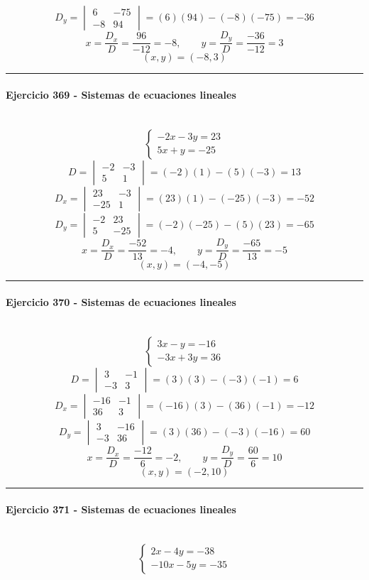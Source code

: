\documentclass[10pt,a4paper]{article}
\newcommand{\res}[1]{\paragraph{#1}\mbox{}\\[-1.2em]}
\begin{document}
\[ D_y=\begin{vmatrix}6&-75\\-8&94\end{vmatrix}=(6)(94)-(-8)(-75)=-36 \]
\[ x=\frac{D_x}{D}=\frac{96}{-12}=-8,\qquad y=\frac{D_y}{D}=\frac{-36}{-12}=3 \]
\[ \boxed{(x,y)=(-8,3)} \]
\vspace{1mm}\hrule\vspace{2mm}
\res{Ejercicio 369 - Sistemas de ecuaciones lineales}
\[ \begin{cases}- 2 x - 3 y=23\\5 x + y=-25\end{cases} \]
\[ D=\begin{vmatrix}-2&-3\\5&1\end{vmatrix}=(-2)(1)-(5)(-3)=13 \]
\[ D_x=\begin{vmatrix}23&-3\\-25&1\end{vmatrix}=(23)(1)-(-25)(-3)=-52 \]
\[ D_y=\begin{vmatrix}-2&23\\5&-25\end{vmatrix}=(-2)(-25)-(5)(23)=-65 \]
\[ x=\frac{D_x}{D}=\frac{-52}{13}=-4,\qquad y=\frac{D_y}{D}=\frac{-65}{13}=-5 \]
\[ \boxed{(x,y)=(-4,-5)} \]
\vspace{1mm}\hrule\vspace{2mm}
\res{Ejercicio 370 - Sistemas de ecuaciones lineales}
\[ \begin{cases}3 x - y=-16\\- 3 x + 3 y=36\end{cases} \]
\[ D=\begin{vmatrix}3&-1\\-3&3\end{vmatrix}=(3)(3)-(-3)(-1)=6 \]
\[ D_x=\begin{vmatrix}-16&-1\\36&3\end{vmatrix}=(-16)(3)-(36)(-1)=-12 \]
\[ D_y=\begin{vmatrix}3&-16\\-3&36\end{vmatrix}=(3)(36)-(-3)(-16)=60 \]
\[ x=\frac{D_x}{D}=\frac{-12}{6}=-2,\qquad y=\frac{D_y}{D}=\frac{60}{6}=10 \]
\[ \boxed{(x,y)=(-2,10)} \]
\vspace{1mm}\hrule\vspace{2mm}
\res{Ejercicio 371 - Sistemas de ecuaciones lineales}
\[ \begin{cases}2 x - 4 y=-38\\- 10 x - 5 y=-35\end{cases} \]
\end{document}
